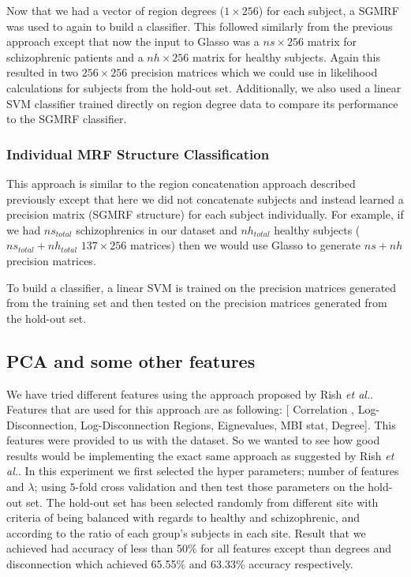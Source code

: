 \documentclass{article} %
\begin{document}
Now that we had a vector of region degrees ($1 \times 256$) for each subject,
a SGMRF was used to again to build a classifier. This followed similarly from
the previous approach except that now the input to Glasso was a $ns \times 256$
matrix for schizophrenic patients and a $nh \times256$ matrix for healthy
subjects. Again this resulted in two $256 \times 256$ precision matrices which
we could use in likelihood calculations for subjects from the hold-out set.
Additionally, we also used a linear SVM classifier trained directly on
region degree data to compare its performance to the SGMRF classifier.


\subsubsection{Individual MRF Structure Classification}

This approach is similar to the region concatenation approach described 
previously except that here we did not concatenate subjects and instead
learned a precision matrix (SGMRF structure) for each subject 
individually. For example, if we had $ns_{total}$ schizophrenics in our 
dataset and $nh_{total}$ healthy subjects ($ns_{total} + nh_{total}$ 
$137 \times 256$ matrices) then we would use Glasso to generate $ns + nh$ 
precision matrices.

To build a classifier, a linear SVM is trained on the precision matrices 
generated from the training set and then tested on the precision matrices 
generated from the hold-out set.

\subsection{PCA and some other features}
We have tried different features using the approach proposed by Rish \emph{et al.}. Features that are used for this approach are as following: [ Correlation , Log-Disconnection, Log-Disconnection Regions, Eignevalues, MBI stat, Degree].
This features were provided to us with the dataset. So we wanted to see how good results would be implementing the exact same approach as suggested by Rish \emph{et al.}. In this experiment we first selected the hyper parameters; number of features and $\lambda$; using $5$-fold cross validation and then test those parameters on the hold-out set. The hold-out set has been selected randomly from different site with criteria of being balanced with regards to healthy and schizophrenic, and according to the ratio of each group's subjects in each site. Result that we achieved had accuracy of less than 50\% for all features except than degrees and disconnection which achieved 65.55\% and 63.33\% accuracy respectively. 
\end{document}
